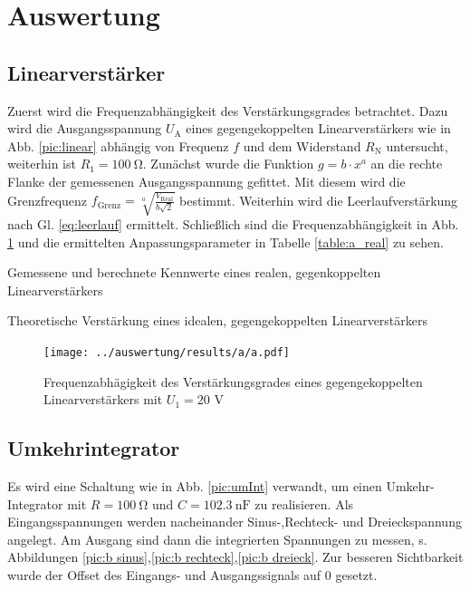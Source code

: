 \section{Auswertung}
\subsection{Linearverstärker}
Zuerst wird die Frequenzabhängigkeit des Verstärkungsgrades betrachtet. Dazu wird die Ausgangsspannung $U_\text{A}$ eines gegengekoppelten Linearverstärkers wie in Abb. \ref{pic:linear} abhängig von Frequenz $f$ und dem Widerstand $R_\text{N}$ untersucht, weiterhin ist $R_1 = 100\ \si{\ohm}$. Zunächst wurde die Funktion $g = b \cdot x^a$ an die rechte Flanke der gemessenen Ausgangsspannung gefittet. Mit diesem wird die Grenzfrequenz $f_\text{Grenz} =\sqrt[a]{\frac{V_\text{Real}}{b\sqrt{2}}}$ bestimmt. Weiterhin wird die Leerlaufverstärkung nach Gl. \ref{eq:leerlauf} ermittelt. Schließlich sind die Frequenzabhängigkeit in Abb. \ref{pic:a plot} und die ermittelten Anpassungsparameter in Tabelle \ref{table:a_real} zu sehen.

\begin{table}
	\centering
	\caption{Gemessene und berechnete Kennwerte eines realen, gegenkoppelten Linearverstärkers}
	
	\label{table:a_real}
\end{table}

\begin{table}
	\centering
	\caption{Theoretische Verstärkung eines idealen, gegengekoppelten Linearverstärkers}
	
	\label{table:a_theorie}
\end{table}

\begin{figure}
	\centering
	\texttt{[image: ../auswertung/results/a/a.pdf]}
	\caption{Frequenzabhägigkeit des Verstärkungsgrades eines gegengekoppelten Linearverstärkers mit $U_1 = 20$ V}
	\label{pic:a plot}
\end{figure}

\subsection{Umkehrintegrator}
Es wird eine Schaltung wie in Abb. \ref{pic:umInt} verwandt, um einen Umkehr-Integrator mit $R = 100\ \si{\ohm}$ und $C = 102.3\ \si{\nano\farad}$ zu realisieren. Als Eingangsspannungen werden nacheinander Sinus-,Rechteck- und Dreieckspannung angelegt. Am Ausgang sind dann die integrierten Spannungen zu messen, s. Abbildungen \ref{pic:b sinus},\ref{pic:b rechteck},\ref{pic:b dreieck}. Zur besseren Sichtbarkeit wurde der Offset des Eingangs- und Ausgangssignals auf 0 gesetzt.

